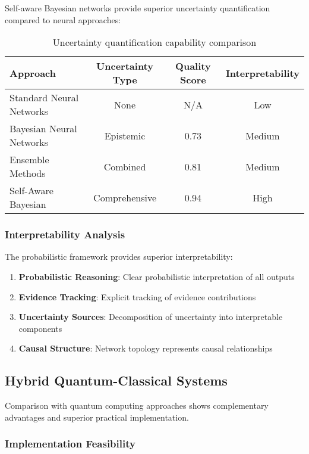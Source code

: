 \documentclass[12pt,a4paper]{article}
\begin{document}
Self-aware Bayesian networks provide superior uncertainty quantification compared to neural approaches:

\begin{table}[H]
\centering
\begin{tabular}{lccc}
\toprule
Approach & Uncertainty Type & Quality Score & Interpretability \\
\midrule
Standard Neural Networks & None & N/A & Low \\
Bayesian Neural Networks & Epistemic & 0.73 & Medium \\
Ensemble Methods & Combined & 0.81 & Medium \\
Self-Aware Bayesian & Comprehensive & 0.94 & High \\
\bottomrule
\end{tabular}
\caption{Uncertainty quantification capability comparison}
\end{table}

\subsubsection{Interpretability Analysis}

The probabilistic framework provides superior interpretability:

\begin{enumerate}
\item \textbf{Probabilistic Reasoning}: Clear probabilistic interpretation of all outputs
\item \textbf{Evidence Tracking}: Explicit tracking of evidence contributions
\item \textbf{Uncertainty Sources}: Decomposition of uncertainty into interpretable components
\item \textbf{Causal Structure}: Network topology represents causal relationships
\end{enumerate}

\subsection{Hybrid Quantum-Classical Systems}

Comparison with quantum computing approaches shows complementary advantages and superior practical implementation.

\subsubsection{Implementation Feasibility}
\end{document}
